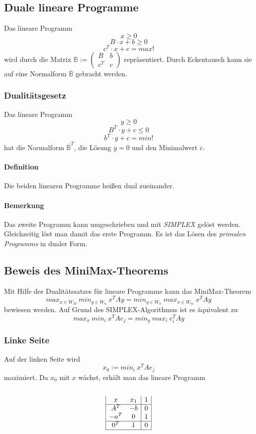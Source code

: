 \subsection{Duale lineare Programme}
Das lineare Programm
\[x \geq 0\]
\[B\cdot x + b \geq 0\]
\[c^T \cdot x + c = max!\]
wird durch die Matrix \(\mathbb{B} := \begin{pmatrix} B & b \\ c^T & c\end{pmatrix}\) repräsentiert. Durch Eckentausch kann sie auf eine Normalform \(\overline{\mathbb{B}}\) gebracht werden.

\subsubsection{Dualitätsgesetz}
Das lineare Programm
\[y \geq 0\]
\[B^T \cdot y + c \leq 0\]
\[b^T \cdot y + c = min!\]
hat die Normalform \(\overline{\mathbb{B}}^T\), die Lösung \(\overline{y}=0\) und den Minimalwert \(\overline{c}\).
\paragraph{Definition} Die beiden linearen Programme heißen dual zueinander.
\paragraph{Bemerkung} Das zweite Programm kann umgeschrieben und mit \textit{SIMPLEX} gelöst werden. Gleichzeitig löst man damit das erste Programm. Es ist das Lösen des \textit{primalen Programms} in dualer Form.


\subsection{Beweis des MiniMax-Theorems}
Mit Hilfe des Dualitätssatzes für lineare Programme kann das MiniMax-Theorem
\[max_{x \in W_M}~min_{y \in W_n}~x^TAy = min_{y \in W_n}~max_{x \in W_m}~x^T A y\]
bewiesen werden. Auf Grund des SIMPLEX-Algorithmus ist es äquivalent zu
\[max_x~min_i~x^T A e_j = min_y~max_i~e_i^T A y\]

\subsubsection{Linke Seite}
Auf der linken Seite wird
\[x_0 := min_i~x^T A e_j\]
maximiert. Da \(x_0\) mit \(x\) wächst, erhält man das lineare Programm
\\\\
\[\begin{array}{|cc|c|}
x & x_1 & 1 \\
\hline
A^T & -b & 0 \\
-a^T & 0 & 1 \\
\hline
0^T & 1 & 0 \\
\hline
\end{array}\]

